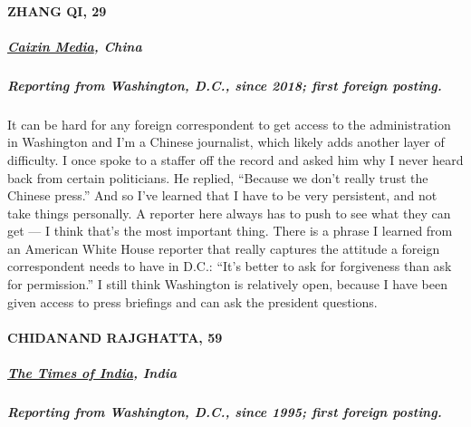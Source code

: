 \hypertarget{zhang-qi-29}{%
\paragraph{ZHANG QI, 29}\label{zhang-qi-29}}

\hypertarget{caixin-media-china}{%
\subparagraph{\texorpdfstring{\textbf{\href{https://www.caixinglobal.com/}{Caixin
Media}, China}}{Caixin Media, China}}\label{caixin-media-china}}

\hypertarget{reporting-from-washington-dc-since-2018-first-foreign-posting-2}{%
\subparagraph{\texorpdfstring{\textbf{Reporting from Washington, D.C.,
since 2018; first foreign
posting.}}{Reporting from Washington, D.C., since 2018; first foreign posting.}}\label{reporting-from-washington-dc-since-2018-first-foreign-posting-2}}

It can be hard for any foreign correspondent to get access to the
administration in Washington and I'm a Chinese journalist, which likely
adds another layer of difficulty. I once spoke to a staffer off the
record and asked him why I never heard back from certain politicians. He
replied, ``Because we don't really trust the Chinese press.'' And so
I've learned that I have to be very persistent, and not take things
personally. A reporter here always has to push to see what they can get
--- I think that's the most important thing. There is a phrase I learned
from an American White House reporter that really captures the attitude
a foreign correspondent needs to have in D.C.: ``It's better to ask for
forgiveness than ask for permission.'' I still think Washington is
relatively open, because I have been given access to press briefings and
can ask the president questions.

\hypertarget{chidanand-rajghatta-59}{%
\paragraph{CHIDANAND RAJGHATTA, 59}\label{chidanand-rajghatta-59}}

\hypertarget{the-times-of-india-india}{%
\subparagraph{\texorpdfstring{\textbf{\href{https://timesofindia.indiatimes.com/us}{The
Times of India},
India}}{The Times of India, India}}\label{the-times-of-india-india}}

\hypertarget{reporting-from-washington-dc-since-1995-first-foreign-posting}{%
\subparagraph{\texorpdfstring{\textbf{Reporting from Washington, D.C.,
since 1995; first foreign
posting.}}{Reporting from Washington, D.C., since 1995; first foreign posting.}}\label{reporting-from-washington-dc-since-1995-first-foreign-posting}}

